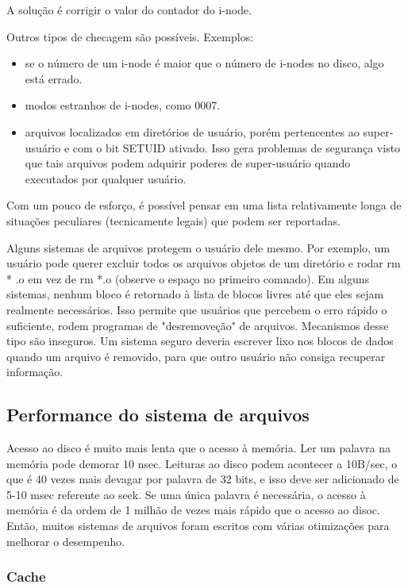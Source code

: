\documentclass{article}
\begin{document}
A solução é corrigir o valor do contador do i-node.

Outros tipos de checagem são possíveis. Exemplos: 
\begin{itemize}
  \item se o número de um i-node é maior que o número de i-nodes no disco, algo está errado. 
  \item modos estranhos de i-nodes, como 0007.
  \item arquivos localizados em diretórios de usuário, porém pertencentes ao super-usuário e com o bit SETUID ativado. Isso gera problemas de segurança visto que tais arquivos podem adquirir poderes de super-usuário quando executados por qualquer usuário.
\end{itemize}

Com um pouco de esforço, é possível pensar em uma lista relativamente longa de situações peculiares (tecnicamente legais) que podem ser reportadas.

Alguns sistemas de arquivos protegem o usuário dele mesmo. Por exemplo, um usuário pode querer excluir todos os arquivos objetos de um diretório e rodar rm * .o em vez de rm *.o (observe o espaço no primeiro comnado). Em alguns sistemas, nenhum bloco é retornado à lista de blocos livres até que eles sejam realmente necessários. Isso permite que usuários que percebem o erro rápido o suficiente, rodem programas de "desremoveção" de arquivos. Mecanismos desse tipo são inseguros. Um sistema seguro deveria escrever lixo nos blocos de dados quando um arquivo é removido, para que outro usuário não consiga recuperar informação.

\subsection{Performance do sistema de arquivos}
Acesso ao disco é muito mais lenta que o acesso à memória. Ler um palavra na memória pode demorar 10 nsec. Leituras ao disco podem acontecer a 10B/sec, o que é 40 vezes mais devagar por palavra de 32 bits, e isso deve ser adicionado de 5-10 msec referente ao seek. Se uma única palavra é necessária, o acesso à memória é da ordem de 1 milhão de vezes mais rápido que o acesso ao disoc. Então, muitos sistemas de arquivos foram escritos com várias otimizações para melhorar o desempenho.

\subsubsection{Cache}
\end{document}
